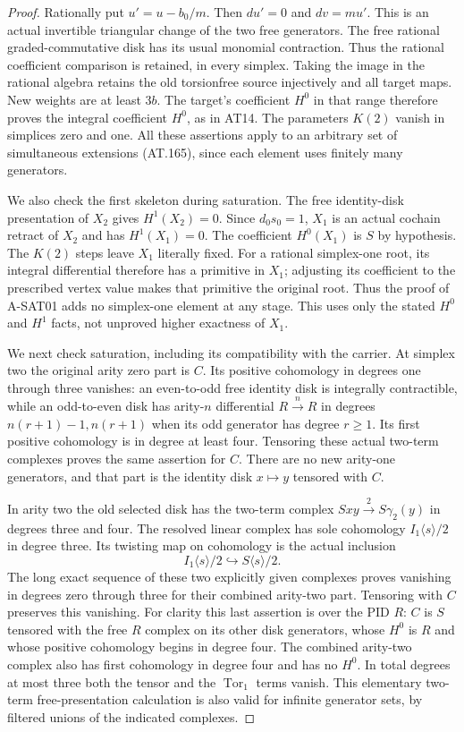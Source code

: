 \begin{proof}
Rationally put $u'=u-b_0/m$. Then $du'=0$ and
$dv=mu'$. This is an actual invertible triangular
change of the two free generators.
The free rational graded-commutative disk has its
usual monomial contraction. Thus the rational
coefficient comparison is retained, in every simplex.
Taking the image in the rational algebra retains
the old torsionfree source injectively and all
target maps. New weights are at least $3b$.
The target's coefficient $H^0$ in that range
therefore proves the integral coefficient $H^0$,
as in AT14. The parameters $K(2)$ vanish in
simplices zero and one.
All these assertions apply to an arbitrary set of
simultaneous extensions (AT.165), since each element
uses finitely many generators.

We also check the first skeleton during saturation.
The free identity-disk presentation of $X_2$ gives
$H^1(X_2)=0$. Since $d_0s_0=1$, $X_1$ is an actual
cochain retract of $X_2$ and has $H^1(X_1)=0$.
The coefficient $H^0(X_1)$ is $S$ by hypothesis.
The $K(2)$ steps leave $X_1$ literally fixed.
For a rational simplex-one root, its integral
differential therefore has a primitive in $X_1$;
adjusting its coefficient to the prescribed vertex
value makes that primitive the original root.
Thus the proof of A-SAT01 adds no simplex-one
element at any stage. This uses only the stated
$H^0$ and $H^1$ facts, not unproved higher exactness
of $X_1$.

We next check saturation, including its compatibility
with the carrier. At simplex two the original arity
zero part is $C$. Its positive cohomology in degrees
one through three vanishes: an even-to-odd free
identity disk is integrally contractible, while an
odd-to-even disk has arity-$n$ differential
$R\xrightarrow{\,n\,}R$ in degrees
$n(r+1)-1,n(r+1)$ when its odd generator has degree
$r\geq1$. Its first positive cohomology is in degree
at least four. Tensoring these actual two-term
complexes proves the same assertion for $C$.
There are no new arity-one generators, and that
part is the identity disk $x\mapsto y$ tensored
with $C$.

In arity two the old selected disk has the
two-term complex
$Sxy\xrightarrow{\,2\,}S\gamma_2(y)$ in degrees
three and four.
The resolved linear complex has sole cohomology
$I_1\langle s\rangle/2$ in degree three.
Its twisting map on cohomology is the actual
inclusion
\[
             I_1\langle s\rangle/2
                    \hookrightarrow S\langle s\rangle/2 .
 \tag{AT.166}
\]
The long exact sequence of these two explicitly
given complexes proves vanishing in degrees zero
through three for their combined arity-two part.
Tensoring with $C$ preserves this vanishing.
For clarity this last assertion is over the PID
$R$: $C$ is $S$ tensored with the free $R$ complex
on its other disk generators, whose $H^0$ is $R$
and whose positive cohomology begins in degree four.
The combined arity-two complex also has first
cohomology in degree four and has no $H^0$.
In total degrees at most three both the tensor
and the $\operatorname{Tor}_1$ terms vanish.
This elementary two-term free-presentation
calculation is also valid for infinite generator
sets, by filtered unions of the indicated complexes.


\end{proof}
